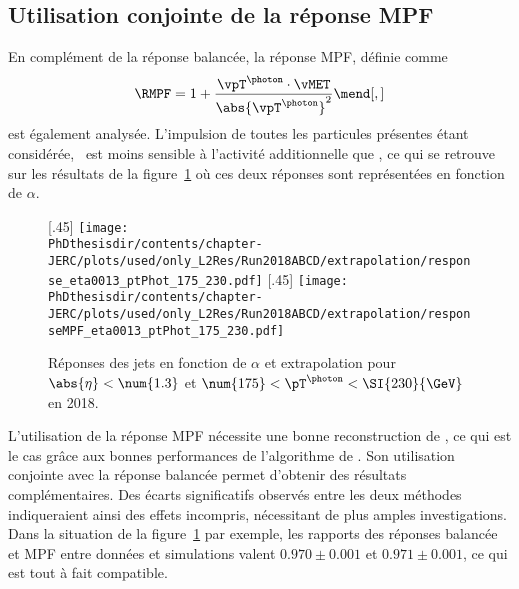 \subsection{Utilisation conjointe de la réponse MPF}
En complément de la réponse balancée, la réponse MPF, définie comme
\begin{equation}
\RMPF = 1 + \frac{\vpT^{\photon}\cdot\vMET}{\abs{\vpT^{\photon}}^2}
\mend[,]
\end{equation}
est également analysée.
L'impulsion de toutes les particules présentes étant considérée, \RMPF\ est moins sensible à l'activité additionnelle que \Rbal, ce qui se retrouve sur les résultats de la figure~\ref{fig-responsebal_and_MPF_eta0013_ptPhot_175_230} où ces deux réponses sont représentées en fonction de $\alpha$.
\begin{figure}[h]
\centering
{}[.45\textwidth]
{\texttt{[image: \\PhDthesisdir/contents/chapter-JERC/plots/used/only\_L2Res/Run2018ABCD/extrapolation/response\_eta0013\_ptPhot\_175\_230.pdf]}}
\qquad
{}[.45\textwidth]
{\texttt{[image: \\PhDthesisdir/contents/chapter-JERC/plots/used/only\_L2Res/Run2018ABCD/extrapolation/responseMPF\_eta0013\_ptPhot\_175\_230.pdf]}}
\caption[Réponses des jets en fonction de $\alpha$.]{Réponses des jets en fonction de $\alpha$ et extrapolation pour $\abs{\eta}<\num{1.3}$ et $\num{175}<\pT^{\photon}<\SI{230}{\GeV}$ en 2018.}
\label{fig-responsebal_and_MPF_eta0013_ptPhot_175_230}
\end{figure}
\par L'utilisation de la réponse MPF nécessite une bonne reconstruction de \vMET, ce qui est le cas grâce aux bonnes performances de l'algorithme de \PF.
Son utilisation conjointe avec la réponse balancée permet d'obtenir des résultats complémentaires.
Des écarts significatifs observés entre les deux méthodes indiqueraient ainsi des effets incompris, nécessitant de plus amples investigations.
Dans la situation de la figure~\ref{fig-responsebal_and_MPF_eta0013_ptPhot_175_230} par exemple, les rapports des réponses balancée et MPF entre données et simulations valent
$\num{0.970}\pm\num{0.001}$
et
$\num{0.971}\pm\num{0.001}$,
ce qui est tout à fait compatible.